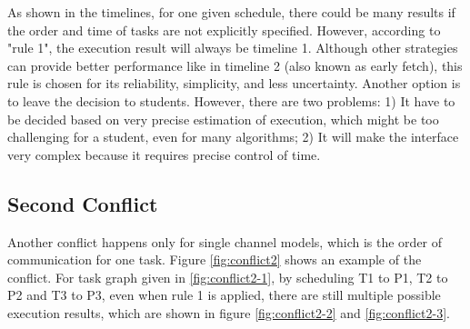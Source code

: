 \documentclass[msc,deptreport, cs]{infthesis}
\begin{document}
As shown in the timelines, for one given schedule, there could be many results if the order and time of tasks are not explicitly specified. However, according to "rule 1", the execution result will always be timeline 1. Although other strategies can provide better performance like in timeline 2 (also known as early fetch), this rule is chosen for its reliability, simplicity, and less uncertainty. Another option is to leave the decision to students. However, there are two problems: 1) It have to be decided based on very precise estimation of execution, which might be too challenging for a student, even for many algorithms; 2) It will make the interface very complex because it requires precise control of time.

\subsection{Second Conflict}

Another conflict happens only for single channel models, which is the order of communication for one task. Figure \ref{fig:conflict2} shows an example of the conflict. For task graph given in \ref{fig:conflict2-1}, by scheduling T1 to P1, T2 to P2 and T3 to P3, even when rule 1 is applied, there are still multiple possible execution results, which are shown in figure \ref{fig:conflict2-2} and \ref{fig:conflict2-3}. 
\end{document}
